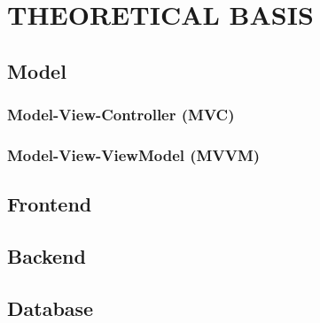 \section{THEORETICAL BASIS}

\subsection{Model}

\subsubsection{Model-View-Controller (MVC)}

\subsubsection{Model-View-ViewModel (MVVM)}

\subsection{Frontend}

\subsection{Backend}

\subsection{Database}
